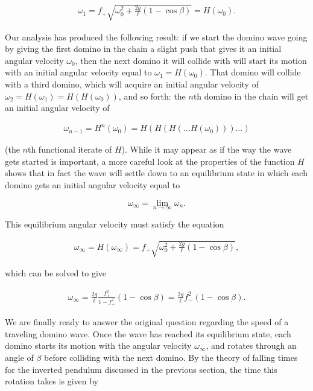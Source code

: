 \documentclass[11pt]{report}
\theoremstyle{plain}
\theoremstyle{definition}
\begin{document}
\begin{align*}
\omega_1 = f_+ \sqrt{\omega_0^2 + \frac{2g}{\ell}(1-\cos \beta)} = H(\omega_0).
\end{align*}

\noindent Our analysis has produced the following result: if we
start the domino wave going by giving the first domino
in the chain a slight push that gives it an initial
angular velocity $\omega_0$, then the next domino it
will collide with will start its motion with an
initial angular velocity equal to
$\omega_1=H(\omega_0)$. That domino will collide with
a third domino, which will acquire an initial angular
velocity of $\omega_2=H(\omega_1)=H(H(\omega_0))$, and
so forth: the $n$th domino in the chain will get an
initial angular velocity of

\begin{align*}
\omega_{n-1} = H^{n}(\omega_0) = H(H(H(\ldots H(\omega_0)))\ldots)
\end{align*}

\noindent (the $n$th functional iterate of $H$). While it may
appear as if the way the wave gets started is
important, a more careful look at the properties of
the function $H$ shows that in fact the wave will
settle down to an equilibrium state in which each
domino gets an initial angular velocity equal to

\[
\omega_\infty = \lim_{n\to\infty} \omega_n.
\]

\noindent This equilibrium angular velocity must satisfy the
equation

\begin{align*}
\omega_\infty = H(\omega_\infty) = f_+ \sqrt{\omega_0^2 + \frac{2g}{\ell}(1-\cos \beta)},
\end{align*}

\noindent which can be solved to give

\begin{align*}
\omega_\infty = \frac{2g}{\ell}\frac{f_+^2}{1-f_+^2}(1-\cos\beta) = \frac{2g}{\ell}f_-^2(1-\cos\beta).
\end{align*}

\noindent We are finally ready to answer the original question
regarding the speed of a traveling domino wave. Once
the wave has reached its equilibrium state, each
domino starts its motion with the angular velocity
$\omega_\infty$, and rotates through an angle of
$\beta$ before colliding with the next domino. By the
theory of falling times for the inverted pendulum
discussed in the previous section, the time this
rotation takes is given by
\end{document}
